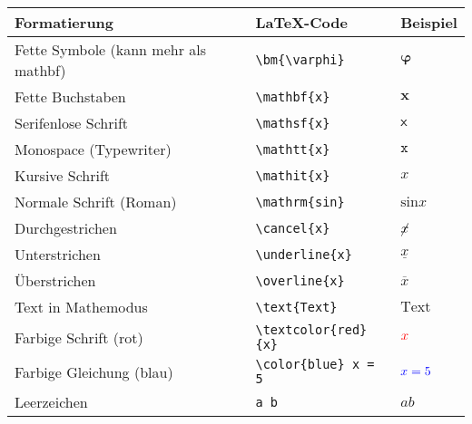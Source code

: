 \begin{table}[h]
    \centering
    \renewcommand{\arraystretch}{1.3}
    \begin{tabular}{lll}
        \toprule
        \textbf{Formatierung}                & \textbf{LaTeX-Code}                                 & \textbf{Beispiel}        \\
        \midrule
        Fette Symbole (kann mehr als mathbf) & \texttt{\textbackslash bm\{\textbackslash varphi\}} & \( \bm{\varphi} \)       \\
        Fette Buchstaben                     & \texttt{\textbackslash mathbf\{x\}}                 & \( \mathbf{x} \)         \\
        Serifenlose Schrift                  & \texttt{\textbackslash mathsf\{x\}}                 & \( \mathsf{x} \)         \\
        Monospace (Typewriter)               & \texttt{\textbackslash mathtt\{x\}}                 & \( \mathtt{x} \)         \\
        Kursive Schrift                      & \texttt{\textbackslash mathit\{x\}}                 & \( \mathit{x} \)         \\
        Normale Schrift (Roman)              & \texttt{\textbackslash mathrm\{sin\}}               & \( \mathrm{sin} x \)     \\
        \midrule
        Durchgestrichen                      & \texttt{\textbackslash cancel\{x\}}                 & \( \cancel{x} \)         \\
        Unterstrichen                        & \texttt{\textbackslash underline\{x\}}              & \( \underline{x} \)      \\
        Überstrichen                         & \texttt{\textbackslash overline\{x\}}               & \( \overline{x} \)       \\
        \midrule
        Text in Mathemodus                   & \texttt{\textbackslash text\{Text\}}                & \( \text{Text} \)        \\
        \midrule
        Farbige Schrift (rot)                & \texttt{\textbackslash textcolor\{red\}\{x\}}       & \( \textcolor{red}{x} \) \\
        Farbige Gleichung (blau)             & \texttt{\textbackslash color\{blue\} x = 5}         & \( \color{blue} x = 5 \) \\
        \midrule
        Leerzeichen                          & \texttt{a b}                                        & \( a  b \)               \\

\end{tabular}
\end{table}
